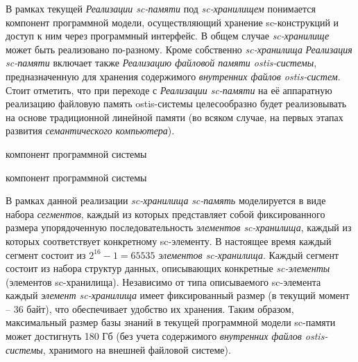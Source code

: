 В рамках текущей \textit{Реализации sc-памяти} под \textit{sc-хранилищем} понимается компонент программной
модели, осуществляющий хранение sc-конструкций и доступ к ним через программный интерфейс. В общем случае
\textit{sc-хранилище} может быть реализовано по-разному. Кроме собственно \textit{sc-хранилища}
\textit{Реализация sc-памяти} включает также \textit{Реализацию файловой памяти ostis-системы},
предназначенную для хранения содержимого \textit{внутренних файлов ostis-систем}. Стоит отметить, что при переходе с
\textit{Реализации sc-памяти} на её аппаратную реализацию файловую память ostis-системы целесообразно будет
реализовывать на основе традиционной линейной памяти (во всяком случае, на первых этапах развития
\textit{семантического компьютера}).


\begin{SCn}
\begin{scnrelfromlist}{компонент программной системы}
    \begin{scnrelfromlist}{компонент программной системы}
    \end{scnrelfromlist}
\end{scnrelfromlist}
\end{SCn}

В рамках данной реализации \textit{sc-хранилища} \textit{sc-память} моделируется в виде набора \textit{сегментов},
каждый из которых представляет собой фиксированного размера упорядоченную последовательность \textit{элементов sc-хранилища},
каждый из которых соответствует конкретному sc-элементу. В настоящее время каждый сегмент состоит из $2^{16}-1=65535$
\textit{элементов sc-хранилища}. Каждый сегмент состоит из набора структур данных, описывающих конкретные
\textit{sc-элементы} (элементов sc-хранилища). Независимо от типа описываемого sc-элемента каждый \textit{элемент sc-хранилища}
имеет фиксированный размер (в текущий момент -- 36 байт), что обеспечивает удобство их хранения. Таким образом,
максимальный размер базы знаний в текущей программной модели sc-памяти может достигнуть 180 Гб (без учета содержимого
\textit{внутренних файлов ostis-системы}, хранимого на внешней файловой системе).

